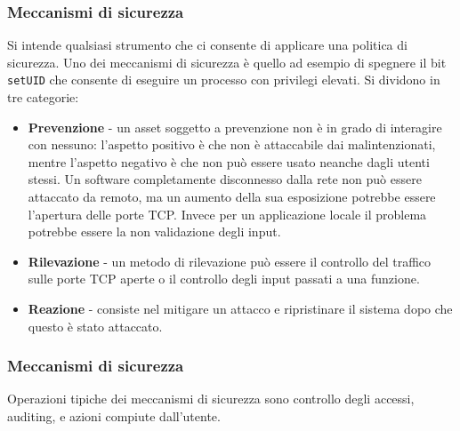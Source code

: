 \subsubsection{Meccanismi di sicurezza}
Si intende qualsiasi strumento che ci consente di applicare una politica di sicurezza. Uno dei meccanismi di sicurezza è quello ad esempio di spegnere il bit \texttt{setUID} che consente di eseguire un processo con privilegi elevati.
Si dividono in tre categorie:
\begin{itemize}
    \item \textbf{Prevenzione} - un asset soggetto a prevenzione non è in grado di interagire con nessuno: l'aspetto positivo è che non è attaccabile dai malintenzionati, mentre l'aspetto negativo è che non può essere usato neanche dagli utenti stessi. Un software completamente disconnesso dalla rete non può essere attaccato da remoto, ma un aumento della sua esposizione potrebbe essere l'apertura delle porte TCP. Invece per un applicazione locale il problema potrebbe essere la non validazione degli input.
    \item \textbf{Rilevazione} - un metodo di rilevazione può essere il controllo del traffico sulle porte TCP aperte o il controllo degli input passati a una funzione.
    \item \textbf{Reazione} - consiste nel mitigare un attacco e ripristinare il sistema dopo che questo è stato attaccato.
\end{itemize}
\subsubsection{Meccanismi di sicurezza}
Operazioni tipiche dei meccanismi di sicurezza sono controllo degli accessi, auditing, e azioni compiute dall'utente.


\let\cleardoublepage\clearpage